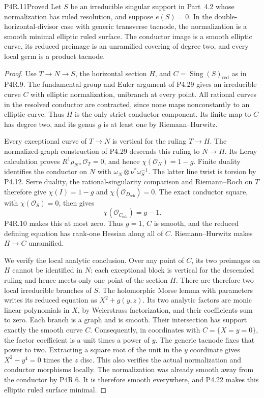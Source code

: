 \begin{statement}{P4R.11}{Proved}
Let $S$ be an irreducible singular support in Part~4.2 whose
normalization has ruled resolution, and suppose $e(S)=0$.
In the double-horizontal-divisor case with generic transverse
tacnode, the normalization is a smooth minimal elliptic ruled
surface. The conductor image is a smooth elliptic curve, its
reduced preimage is an unramified covering of degree two,
and every local germ is a product tacnode.
\end{statement}
\begin{proof}
Use $T\to N\to S$, the horizontal section $H$, and
$C=\operatorname{Sing}(S)_{\mathrm{red}}$ as in P4R.9.
The fundamental-group and Euler argument of P4.29 gives an
irreducible curve $C$ with elliptic normalization, unibranch
at every point. All rational curves in the resolved conductor
are contracted, since none maps nonconstantly to an elliptic
curve. Thus $H$ is the only strict conductor component.
Its finite map to $C$ has degree two, and its genus $g$ is at
least one by Riemann--Hurwitz.

Every exceptional curve of $T\to N$ is vertical for the ruling
$T\to H$. The normalized-graph construction of P4.29 descends
this ruling to $N\to H$. Its Leray calculation proves
$R^1\rho_{N*}\mathcal O_T=0$, and hence
$\chi(\mathcal O_N)=1-g$. Finite duality identifies the
conductor on $N$ with $\omega_N\otimes\nu^*\omega_S^{-1}$.
The latter line twist is torsion by P4.12. Serre duality,
the rational-singularity comparison and Riemann--Roch on $T$
therefore give $\chi(I)=1-g$ and
$\chi(\mathcal O_{D_{\mathrm{sch}}})=0$.
The exact conductor square, with $\chi(\mathcal O_S)=0$,
then gives
\[
 \chi(\mathcal O_{C_{\mathrm{sch}}})=g-1.
\]
P4R.10 makes this at most zero. Thus $g=1$, $C$ is smooth,
and the reduced defining equation has rank-one Hessian along
all of $C$. Riemann--Hurwitz makes $H\to C$ unramified.

We verify the local analytic conclusion. Over any point of
$C$, its two preimages on $H$ cannot be identified in $N$:
each exceptional block is vertical for the descended ruling
and hence meets only one point of the section $H$.
There are therefore two local irreducible branches of $S$.
The holomorphic Morse lemma with parameters writes its reduced
equation as $X^2+g(y,z)$. Its two analytic factors are monic
linear polynomials in $X$, by Weierstrass factorization, and
their coefficients sum to zero. Each branch is a graph and
is smooth. Their intersection has support exactly the smooth
curve $C$. Consequently, in coordinates with $C=\{X=y=0\}$,
the factor coefficient is a unit times a power of $y$.
The generic tacnode fixes that power to two. Extracting a square
root of the unit in the $y$ coordinate gives
$X^2-y^4=0$ times the $z$ disc. This also verifies the actual
normalization and conductor morphisms locally.
The normalization was already smooth away from the conductor
by P4R.6. It is therefore smooth everywhere, and P4.22 makes
this elliptic ruled surface minimal.
\end{proof}

